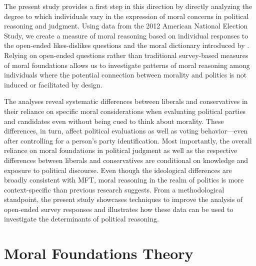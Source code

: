 \documentclass[12pt]{article}
\begin{document}
The present study provides a first step in this direction by directly analyzing the degree to which individuals vary in the expression of moral concerns in political reasoning and judgment. Using data from the 2012 American National Election Study, we create a measure of moral reasoning based on individual responses to the open-ended likes-dislikes questions and the moral dictionary introduced by \citet{graham2009liberals}. Relying on open-ended questions rather than traditional survey-based measures of moral foundations allows us to investigate patterns of moral reasoning among individuals where the potential connection between morality and politics is not induced or facilitated by design.

The analyses reveal systematic differences between liberals and conservatives in their reliance on specific moral considerations when evaluating political parties and candidates even without being cued to think about morality.
These differences, in turn, affect political evaluations as well as voting behavior---even after controlling for a person's party identification. Most importantly, the overall reliance on moral foundations in political judgment as well as the respective differences between liberals and conservatives are conditional on knowledge and exposure to political discourse. Even though the ideological differences are broadly consistent with MFT, moral reasoning in the realm of politics is more context-specific than previous research suggests. From a methodological standpoint, the present study showcases techniques to improve the analysis of open-ended survey responses and illustrates how these data can be used to investigate the determinants of political reasoning.

\section*{Moral Foundations Theory}
\end{document}
